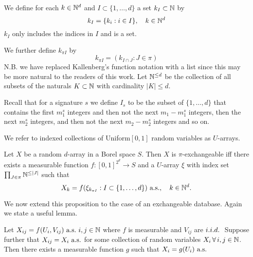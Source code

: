 We define for each $k \in \mathbb{N}^d$ and $I \subset \{1,\ldots,d\}$ a set $k_I \subset \mathbb{N}$ by
\begin{equation}
k_I = \{k_i: i \in I\}, \quad k \in \mathbb{N}^d
\end{equation}
\ie $k_I$ only includes the indices in $I$ and is a set.

We further define $k_{\pi I}$ by
\begin{equation}
  k_{\pi I} = (k_{I \cap J} : J \in \pi)
\end{equation}
N.B. we have replaced Kallenberg's function notation with a list since this may be more natural to the readers of this work.
Let $\mathbb{N}^{\leq d}$ be the collection of all subsets of the naturals $K \subset \mathbb{N}$ with cardinality $|K| \leq d$.

Recall that for a signature $s$ we define $I_s$ to be the subset of $\{1,\ldots,d\}$ that contains the first $m_1^s$ integers and then not the next $m_1 - m_1^s$ integers, then the next $m_2^s$ integers, and then not the next $m_2 - m_2^s$ integers and so on.

We refer to indexed collections of \iid Uniform$[0,1]$ random variables as $U$-arrays.

\begin{prop}
\label{prop:piexas}
  Let $X$ be a random $d$-array in a Borel space $S$.
  Then $X$ is $\pi$-exchangeable iff there exists a measurable function $f:[0,1]^{2^d}\to S$ and a $U$-array $\xi$ with index set $\prod_{J\in\pi} \mathbb{N}^{\leq |J|}$ such that
  \begin{equation}
    X_k = f(\xi_{k_{\pi I}} : I \subset \{1,\ldots,d\}) \ \textrm{a.s.}, \quad k \in \mathbb{N}^d.
    \label{eq:piexas}
  \end{equation}
\end{prop}

We now extend this proposition to the case of an exchangeable database.
Again we state a useful lemma.

\begin{lemma}
  \label{lemma:copies-full-simple}
  Let $X_{ij} = f({U}_i, {V}_{ij}) \ \textrm{a.s.} \ i,j \in \mathbb{N}$ where $f$ is measurable and ${V}_{ij}$ are $i.i.d.\ $
  Suppose further that $X_{ij} = X_i \ \textrm{a.s.}$ for some collection of random variables $X_{i} \, \forall \, i,j \in \mathbb{N}$.
  Then there exists a measurable function $g$ such that $X_i = g({U}_i) \ \textrm{a.s.}$
\end{lemma}

